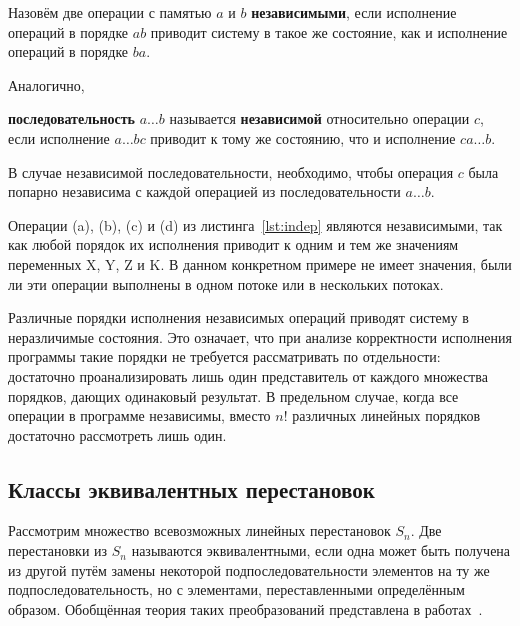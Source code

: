 \begin{definition}
  \label{def:indep-pair}
  Назовём две операции с памятью $a$ и $b$ \textbf{независимыми}, если
  исполнение операций в порядке $ab$ приводит систему в такое же
  состояние, как и исполнение операций в порядке $ba$.
\end{definition}
Аналогично,
\begin{definition}
  \label{def:indep-seq}
  \textbf{последовательность} $a \dots b$ называется
  \textbf{независимой} относительно операции $c$, если исполнение
  $a \dots bc$ приводит к тому же состоянию, что и исполнение $ca \dots b$.
\end{definition}
В случае независимой последовательности, необходимо, чтобы
операция $c$ была попарно независима с каждой операцией из
последовательности $a\dots b$.

Операции (a), (b), (c) и (d) из листинга~\ref{lst:indep} являются
независимыми, так как любой порядок их исполнения приводит к одним и
тем же значениям переменных X, Y, Z и K. В данном конкретном
примере не имеет значения, были ли эти операции выполнены в одном
потоке или в нескольких потоках.

\begin{minipage}{\textwidth}
  \centering
  
\end{minipage}

Различные порядки исполнения независимых операций приводят систему в
неразличимые состояния. Это означает, что при анализе корректности
исполнения программы такие порядки не требуется рассматривать по
отдельности: достаточно проанализировать лишь один представитель от
каждого множества порядков, дающих одинаковый результат.
В предельном случае, когда все операции в программе независимы,
вместо $n!$ различных линейных порядков достаточно рассмотреть лишь один.

\subsection{Классы эквивалентных перестановок}
\label{sec:ch1/eqiv-cl}

Рассмотрим множество всевозможных линейных перестановок $S_n$. Две
перестановки из $S_n$ называются эквивалентными, если одна может быть
получена из другой путём замены некоторой подпоследовательности
элементов на ту же подпоследовательность, но с элементами,
переставленными определённым образом. Обобщённая теория таких
преобразований представлена в работах~\cite{knuth,dual,representation}.

